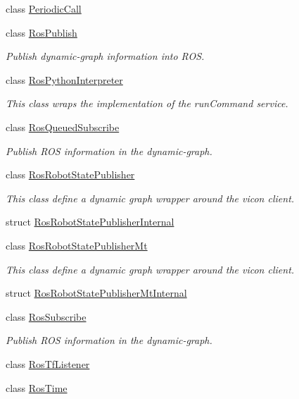 \begin{DoxyCompactItemize}
class \hyperlink{classdynamic__graph_1_1PeriodicCall}{Periodic\+Call}
\item 
class \hyperlink{classdynamic__graph_1_1RosPublish}{Ros\+Publish}
\begin{DoxyCompactList}\small\item\em Publish dynamic-\/graph information into R\+OS. \end{DoxyCompactList}\item 
class \hyperlink{classdynamic__graph_1_1RosPythonInterpreter}{Ros\+Python\+Interpreter}
\begin{DoxyCompactList}\small\item\em This class wraps the implementation of the run\+Command service. \end{DoxyCompactList}\item 
class \hyperlink{classdynamic__graph_1_1RosQueuedSubscribe}{Ros\+Queued\+Subscribe}
\begin{DoxyCompactList}\small\item\em Publish R\+OS information in the dynamic-\/graph. \end{DoxyCompactList}\item 
class \hyperlink{classdynamic__graph_1_1RosRobotStatePublisher}{Ros\+Robot\+State\+Publisher}
\begin{DoxyCompactList}\small\item\em This class define a dynamic graph wrapper around the vicon client. \end{DoxyCompactList}\item 
struct \hyperlink{structdynamic__graph_1_1RosRobotStatePublisherInternal}{Ros\+Robot\+State\+Publisher\+Internal}
\item 
class \hyperlink{classdynamic__graph_1_1RosRobotStatePublisherMt}{Ros\+Robot\+State\+Publisher\+Mt}
\begin{DoxyCompactList}\small\item\em This class define a dynamic graph wrapper around the vicon client. \end{DoxyCompactList}\item 
struct \hyperlink{structdynamic__graph_1_1RosRobotStatePublisherMtInternal}{Ros\+Robot\+State\+Publisher\+Mt\+Internal}
\item 
class \hyperlink{classdynamic__graph_1_1RosSubscribe}{Ros\+Subscribe}
\begin{DoxyCompactList}\small\item\em Publish R\+OS information in the dynamic-\/graph. \end{DoxyCompactList}\item 
class \hyperlink{classdynamic__graph_1_1RosTfListener}{Ros\+Tf\+Listener}
\item 
class \hyperlink{classdynamic__graph_1_1RosTime}{Ros\+Time}
\end{DoxyCompactItemize}

